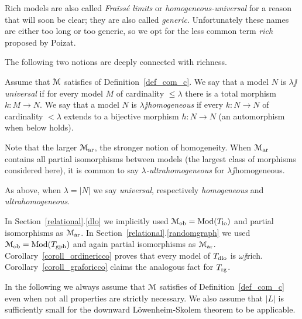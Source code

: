 \documentclass[creche.tex]{subfiles}
\begin{document}
Rich models are also called \textit{Fra\"iss\'e limits} or \textit{homogeneous-universal\/} for a reason that will soon be clear; they are also called \textit{generic}. Unfortunately these names are either too long or too generic, so we opt for the less common term \textit{rich\/} proposed by Poizat. 

The following two notions are deeply connected with richness.

\begin{definition}\label{def_omogenea_universale}
Assume that $\EuScript M$ satisfies  of Definition~\ref{def_com_c}. We say that a model $N$ is \emph{$\lambda\jj$universal\/} if for every model $M$ of cardinality $\le\lambda$ there is a total morphism $k:M\to N$. We say that a model $N$ is \emph{$\lambda\jj$homogeneous\/} if every $k:N\to N$ of cardinality $<\lambda$ extends to a bijective morphism $h:N\to N$ (an automorphism when  below holds).

Note that the larger $\EuScript M_{\rm ar}$, the stronger notion of homogeneity. When  $\EuScript M_{\rm ar}$ contains all partial isomorphisms between models (the largest class of morphisms considered here), it is common to say \emph{$\lambda$-ultra\-homo\-geneous\/} for $\lambda\jj$homogeneous. 

As above, when $\lambda=|N|$ we say \emph{universal}, respectively \emph{homogeneous} and \emph{ultrahomogeneous}.\QED
\end{definition}


In Section~\ref{relational}.\ref{dlo} we implicitly used $\EuScript M_{\rm ob}=\mathop{\rm Mod}(T_{\rm lo})$ and partial isomorphisms as $\EuScript M_{\rm ar}$. In Section~\ref{relational}.\ref{randomgraph} we used $\EuScript M_{\rm ob}=\mathop{\rm Mod}(T_{\rm gph})$ and again partial isomorphisms as $\EuScript M_{\rm ar}$. Corollary~\ref{coroll_ordinericco} proves that every model of $T_{\rm dlo}$ is $\omega\jj$rich.  Corollary~\ref{coroll_graforicco} claims the analogous fact for $T_{\rm rg}$.


In the following we always assume that $\EuScript M$ satisfies  of Definition~\ref{def_com_c} even when not all properties are strictly necessary. We also assume that $|L|$ is sufficiently small for the downward L\"owenheim-Skolem theorem to be applicable.
\end{document}
